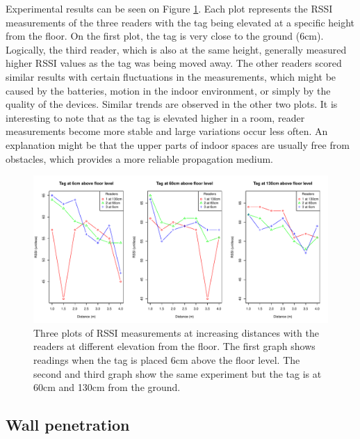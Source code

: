 Experimental results can be seen on Figure \ref{fig:eler}. Each plot represents the RSSI measurements of the three readers with the tag being elevated at a specific height from the floor. On the first plot, the tag is very close to the ground (6cm). Logically, the third reader, which is also at the same height, generally measured higher RSSI values as the tag was being moved away. The other readers scored similar results with certain fluctuations in the measurements, which might be caused by the batteries, motion in the indoor environment, or simply by the quality of the devices. Similar trends are observed in the other two plots. It is interesting to note that as the tag is elevated higher in a room, reader measurements become more stable and large variations occur less often. An explanation might be that the upper parts of indoor spaces are usually free from obstacles, which provides a more reliable propagation medium.
\begin{figure}[H]
	\begin{center}
		\includegraphics[width=1\textwidth]{figures/rssi_distance_4m}
		\caption{Three plots of RSSI measurements at increasing distances with the readers at different elevation from the floor. The first graph shows readings when the tag is placed 6cm above the floor level. The second and third graph show the same experiment but the tag is at 60cm and 130cm from the ground.}
		\label{fig:eler}
	\end{center}
\end{figure}


\subsection{Wall penetration}

